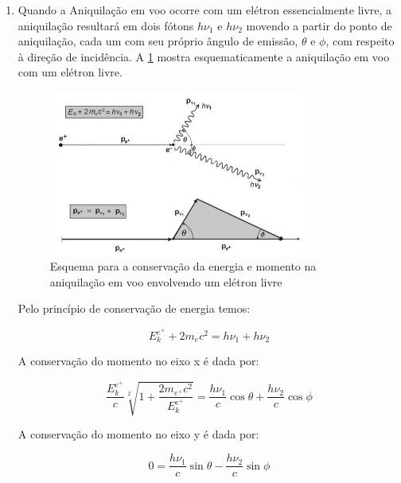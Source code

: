 \documentclass[11pt,a4paper]{article}
\begin{document}
\begin{enumerate}
\begin{enumerate}
				\item Quando a Aniquilação em voo ocorre com um elétron essencialmente livre, a aniquilação resultará em dois fótons $h\nu_1$ e $h\nu_2$ movendo a partir do ponto de aniquilação, cada um com seu próprio ângulo de emissão, $\theta$ e $\phi$, com respeito à direção de incidência. A \ref{fig:aniquilacaoVooEletronLivre} mostra esquematicamente a aniquilação em voo com um elétron livre.
				
				\begin{figure}[h]
					\centering
					\includegraphics[width=0.8\textwidth]{Imagens/esquemaAniquilacaoVoo.JPG}
					\caption{Esquema para a conservação da energia e momento na aniquilação em voo envolvendo um elétron livre}
					\label{fig:aniquilacaoVooEletronLivre}
				\end{figure}

				Pelo princípio de conservação de energia temos:

					\begin{equation*}
						E_k^{e^+} + 2m_ec^2 = h\nu_1 + h\nu_2
					\end{equation*}

				A conservação do momento no eixo x é dada por:

					\begin{equation*}
						\frac{E_k^{e^+}}{c}\sqrt[2]{1 + \frac{2m_{e^+}c^2}{E_k^{e^+}}} = \frac{h\nu_1}{c}\cos \theta + \frac{h\nu_2}{c}\cos \phi
					\end{equation*}

				A conservação do momento no eixo y é dada por:

					\begin{equation*}
						0 = \frac{h\nu_1}{c}\sin \theta - \frac{h\nu_2}{c}\sin \phi
					\end{equation*}

				\end{enumerate}
			
	\end{enumerate}
\end{document}
